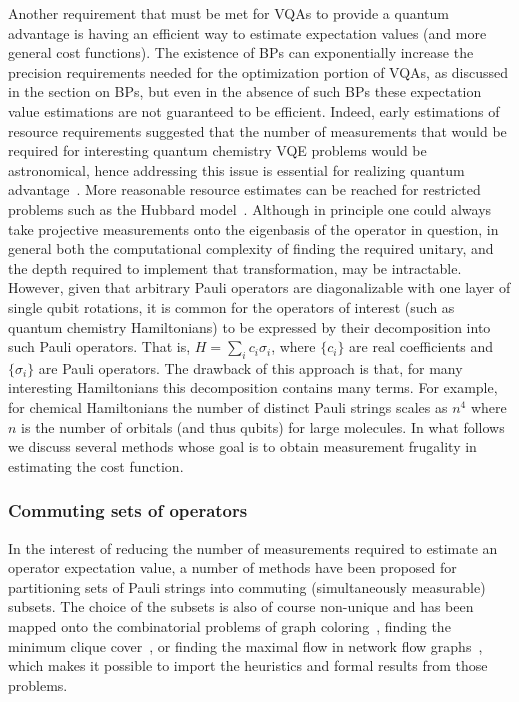\documentclass[prx,twocolumn,floatfix,superscriptaddress,longbibliography]{revtex4-1}
\newcommand{\<}{\langle}
\renewcommand{\>}{\rangle}
\begin{document}
Another requirement that must be met for VQAs to provide a quantum advantage is having an efficient way to estimate expectation values (and more general cost functions). The existence of BPs can exponentially increase the precision requirements needed for the optimization portion of VQAs, as discussed in the section on BPs, but even in the absence of such BPs  these expectation value estimations are not guaranteed to be efficient. Indeed, early estimations of resource requirements suggested that the number of measurements that would be required for interesting quantum chemistry VQE problems would be astronomical, hence addressing this issue is essential for realizing quantum advantage~\cite{wecker2015progress}. More reasonable resource estimates can be reached for restricted problems such as the  Hubbard model~\cite{cai2020hubbard,cade2020fermihubbard}. Although in principle one could always take projective measurements onto the eigenbasis of the operator in question, in general both the computational complexity of finding the required unitary, and the depth required to implement that transformation, may be intractable. However, given that arbitrary Pauli operators  are diagonalizable with one layer of single qubit rotations, it is common for the operators of interest (such as quantum chemistry Hamiltonians) to be expressed by their decomposition into such Pauli operators. That is,  $H=\sum_i c_i \sigma_i$, where $\{c_i\}$ are real coefficients and $\{\sigma_i\}$ are Pauli operators. The drawback of this approach is that, for many interesting Hamiltonians this decomposition contains many terms. For example, for chemical Hamiltonians the number of distinct Pauli strings scales as $n^4$ where $n$ is the number of orbitals (and thus qubits) for large molecules. In what follows we discuss several methods whose goal is to obtain measurement frugality in estimating the cost function.

\subsubsection{ Commuting sets of operators} In the interest of reducing the number of measurements required to estimate an operator expectation value, a number of methods have been proposed for partitioning sets of Pauli strings into commuting (simultaneously measurable)  subsets. The choice of the subsets is also of course non-unique and has been mapped onto the combinatorial problems of graph coloring~\cite{Jena2019,Crawford2019}, finding the minimum clique cover~\cite{verteletskyi2020measurement,Izmaylov2019,zhao2020measurement,Yen2019}, or finding the maximal flow in network flow graphs~\cite{Gokhale2019-2}, which makes it possible to import the heuristics and formal results from those problems. 
\end{document}
